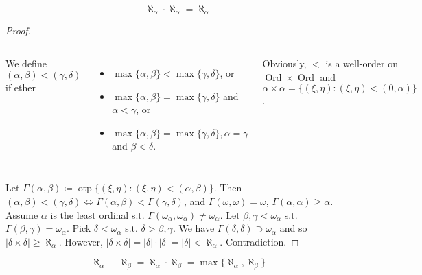 \documentclass[UTF8,11pt,colorlinks,compress,openany]{beamer}%
\begin{document}
\begin{frame}\frametitle{}
\setlength\abovedisplayskip{0pt}
\setlength\belowdisplayskip{0pt}
\begin{theorem}
\[\aleph_\alpha\cdot\aleph_\alpha=\aleph_\alpha\]
\end{theorem}
\begin{proof}
\begin{columns}
We define $(\alpha,\beta)<(\gamma,\delta)$ if ether
\begin{itemize}
	\item $\max\{\alpha,\beta\}<\max\{\gamma,\delta\}$, or
	\item $\max\{\alpha,\beta\}=\max\{\gamma,\delta\}$ and $\alpha<\gamma$, or
	\item $\max\{\alpha,\beta\}=\max\{\gamma,\delta\}, \alpha=\gamma$ and $\beta<\delta$.
\end{itemize}
Obviously, $<$ is a well-order on $\operatorname{Ord}\times\operatorname{Ord}$ and $\alpha\times\alpha=\big\{(\xi,\eta):(\xi,\eta)<(0,\alpha)\big\}$.
\begin{center}
\end{center}
\end{columns}
Let $\Gamma(\alpha,\beta)\coloneqq \operatorname{otp}\big\{(\xi,\eta):(\xi,\eta)<(\alpha,\beta)\big\}$. Then $(\alpha,\beta)<(\gamma,\delta)\iff\Gamma(\alpha,\beta)<\Gamma(\gamma,\delta)$, and $\Gamma(\omega,\omega)=\omega$, $\Gamma(\alpha,\alpha)\geq\alpha$.\\
Assume $\alpha$ is the least ordinal s.t. $\Gamma(\omega_\alpha,\omega_\alpha)\ne \omega_\alpha$. Let $\beta,\gamma<\omega_\alpha$ s.t. $\Gamma(\beta,\gamma)=\omega_\alpha$. Pick $\delta<\omega_\alpha$ s.t. $\delta>\beta,\gamma$. We have $\Gamma(\delta,\delta)\supset\omega_\alpha$ and so $|\delta\times\delta|\geq\aleph_\alpha$. However, $|\delta\times\delta|=|\delta|\cdot|\delta|=|\delta|<\aleph_\alpha$. Contradiction.
\end{proof}
\[\aleph_\alpha+\aleph_\beta=\aleph_\alpha\cdot\aleph_\beta=\max\{\aleph_\alpha,\aleph_\beta\}\]
\end{frame}
\end{document}
